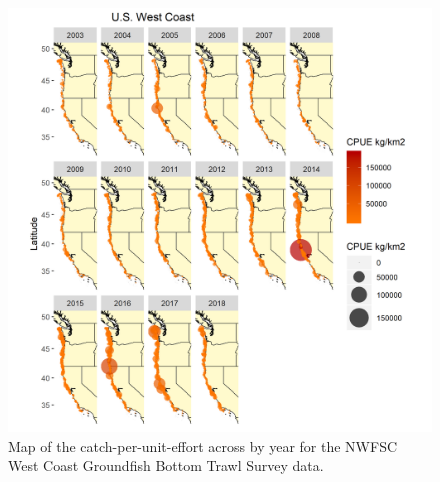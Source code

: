 \documentclass[12pt,]{article}
\begin{document}
\FloatBarrier

\begin{figure}
\centering
\includegraphics{Figures/NWFSC_Combo_CPUE_Map_Year.png}
\caption{Map of the catch-per-unit-effort across by year for the NWFSC
West Coast Groundfish Bottom Trawl Survey data. \label{fig:nw_map}}
\end{figure}

\FloatBarrier
\end{document}
